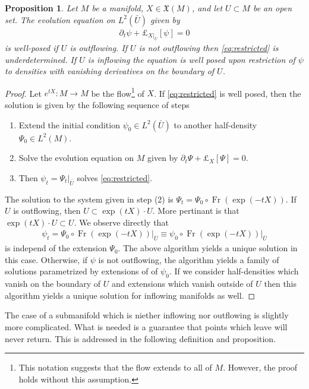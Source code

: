 \documentclass[12pt]{amsart}
\newtheorem{prop}{Proposition}
\DeclareMathOperator{\Fr}{Fr}
\begin{document}
\begin{prop}
  Let $M$ be a manifold, $X \in \mathfrak{X}(M)$, and let $U \subset M$ be an open set.  The evolution equation on $L^2(\bar{U})$ given by
  \begin{align}
    \partial_t \psi + \pounds_{X|_{\bar{U}}}[\psi] = 0 \label{eq:restricted}
  \end{align}
  is well-posed if $U$ is outflowing.
  If $U$ is not outflowing then \eqref{eq:restricted} is underdetermined.
  If $U$ is inflowing the equation is well posed upon restriction of $\psi$ to densities with vanishing derivatives on the boundary of $U$.
\end{prop}
\begin{proof}
  Let $e^{tX}:M \to M$ be the flow\footnote{This notation suggests that the flow extends to all of $M$. However, the proof holds without this assumption.} of $X$.
  If \eqref{eq:restricted} is well posed, then the solution is given by the following sequence of steps
  \begin{enumerate}
    \item Extend the initial condition $\psi_0 \in L^2( \bar{U})$ to another half-density $\Psi_0 \in L^2(M)$.
    \item Solve the evolution equation on $M$ given by $\partial_t \Psi + \pounds_X[\Psi] = 0$.
    \item Then $\psi_t = \Psi_t |_{\bar{U}}$ solves \eqref{eq:restricted}.
  \end{enumerate}
  The solution to the system given in step (2) is $\Psi_t = \Psi_0 \circ \Fr( \exp( -tX) )$.
  If $U$ is outflowing, then $U \subset \exp(tX) \cdot U$.
  More pertinant is that $\exp(tX) \cdot U \subset U$.
  We observe directly that
  \begin{align*}
    \psi_t = \left. \Psi_0 \circ \Fr( \exp( -tX) ) \right|_{\bar{U}}
    \equiv \psi_0 \circ \Fr( \exp(-tX) ) |_{\bar{U}}
  \end{align*}
  is independ of the extension $\Psi_0$.
  The above algorithm yields a unique solution in this case.
  Otherwise, if $\psi$ is not outflowing, the algorithm yields a
  family of solutions parametrized by extensions of of $\psi_0$.
  If we consider half-densities which vanish on the boundary of $U$ and extensions which vanish outside of $U$ then this algorithm yields a unique solution for inflowing manifolds as well.
\end{proof}

The case of a submanifold which is niether inflowing nor outflowing is slightly more complicated.
What is needed is a guarantee that points which leave will never return.
This is addressed in the following definition and proposition.
\end{document}
